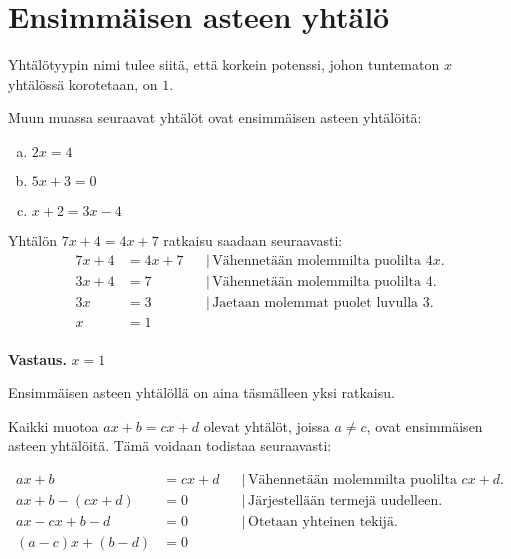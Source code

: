 \section{Ensimmäisen asteen yhtälö}


Yhtälötyypin nimi tulee siitä, että korkein potenssi, johon tuntematon $x$
yhtälössä korotetaan, on $1$.

\begin{esimerkki}
Muun muassa seuraavat yhtälöt ovat ensimmäisen asteen yhtälöitä:
\begin{enumerate}[a)]
\item $2x = 4$
\item $5x+3 = 0$
\item $x+2 = 3x-4$
\end{enumerate}
\end{esimerkki}


\begin{esimerkki}
Yhtälön $7x+4=4x+7$ ratkaisu saadaan seuraavasti:
\begin{align*}
7x+4 &= 4x+7 & &| \, \text{Vähennetään molemmilta puolilta $4x$.} \\
3x+4 &= 7 & &| \, \text{Vähennetään molemmilta puolilta 4.} \\
3x &= 3 & &| \, \text{Jaetaan molemmat puolet luvulla 3.} \\
x &= 1 & & \\
\end{align*}

\textbf{Vastaus.} $x=1$
\end{esimerkki}

Ensimmäisen asteen yhtälöllä on aina täsmälleen yksi ratkaisu.

Kaikki muotoa $ax+b=cx+d$ olevat yhtälöt, joissa $a \neq c$, ovat ensimmäisen asteen yhtälöitä. Tämä voidaan todistaa seuraavasti:

\begin{align*}
ax+b &= cx+d & &| \, \text{Vähennetään molemmilta puolilta $cx+d$}. \\
ax+b - (cx+d) &= 0 & &| \, \text{Järjestellään termejä uudelleen.} \\
ax - cx + b - d &= 0 & &| \, \text{Otetaan yhteinen tekijä.} \\
(a-c)x + (b-d) &= 0 & &
\end{align*}

